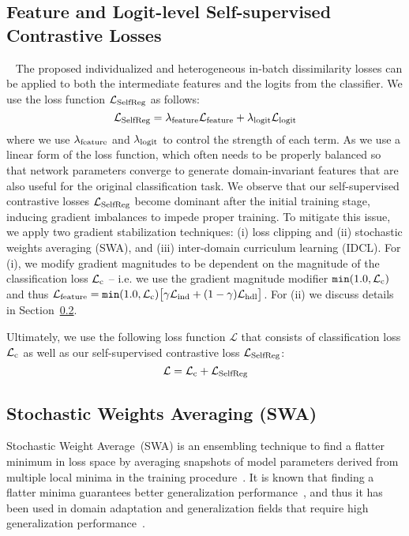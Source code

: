 \documentclass[10pt,twocolumn,letterpaper]{article}
\newcommand{\myparagraph}[1]{\vspace{4pt}\noindent{\bf #1}}
\begin{document}
\subsection{Feature and Logit-level Self-supervised Contrastive Losses}~\label{ss:losses}
The proposed individualized and heterogeneous in-batch dissimilarity losses can be applied to both the intermediate features and the logits from the classifier. We use the loss function $\mathcal{L}_\textnormal{SelfReg}$ as follows:
\begin{equation}
    \mathcal{L}_\textnormal{SelfReg} = \lambda_\textnormal{feature}\mathcal{L}_\textnormal{feature} + \lambda_\textnormal{logit}\mathcal{L}_\textnormal{logit}
\end{equation}
where we use $\lambda_\textnormal{feature}$ and $\lambda_\textnormal{logit}$ to control the strength of each term. As we use a linear form of the loss function, which often needs to be properly balanced so that network parameters converge to generate domain-invariant features that are also useful for the original classification task. We observe that our self-supervised contrastive losses $\mathcal{L}_\textnormal{SelfReg}$ become dominant after the initial training stage, inducing gradient imbalances to impede proper training. 
To mitigate this issue, we apply two gradient stabilization techniques: (i) loss clipping and (ii) stochastic weights averaging (SWA), and (iii) inter-domain curriculum learning (IDCL). For (i), we modify gradient magnitudes to be dependent on the magnitude of the classification loss $\mathcal{L}_\textnormal{c}$ -- i.e. we use the gradient magnitude modifier $\texttt{min}(1.0, \mathcal{L}_\textnormal{c})$ and thus $\mathcal{L}_\textnormal{feature} = \texttt{min}(1.0, \mathcal{L}_\textnormal{c})\big[\gamma\mathcal{L}_\textnormal{ind} + (1-\gamma)\mathcal{L}_\textnormal{hdl}\big]$. For (ii) we discuss details in Section~\ref{ss:swa}.


\myparagraph{Loss Function}
Ultimately, we use the following loss function $\mathcal{L}$ that consists of classification loss $\mathcal{L}_\textnormal{c}$ as well as our self-supervised contrastive loss $\mathcal{L}_\textnormal{SelfReg}$:
\begin{equation}
    \mathcal{L} = \mathcal{L}_\textnormal{c} + \mathcal{L}_\textnormal{SelfReg}
\end{equation}

\subsection{Stochastic Weights Averaging (SWA)}\label{ss:swa}
Stochastic Weight Average~(SWA) is an ensembling technique to find a flatter minimum in loss space by averaging snapshots of model parameters derived from multiple local minima in the training procedure~\cite{izmailov2018averaging}. It is known that finding a flatter minima guarantees better generalization performance~\cite{he2019asymmetric}, and thus it has been used in domain adaptation and generalization fields that require high generalization performance~\cite{zhao2019learning, cha2021domain}.
\end{document}
